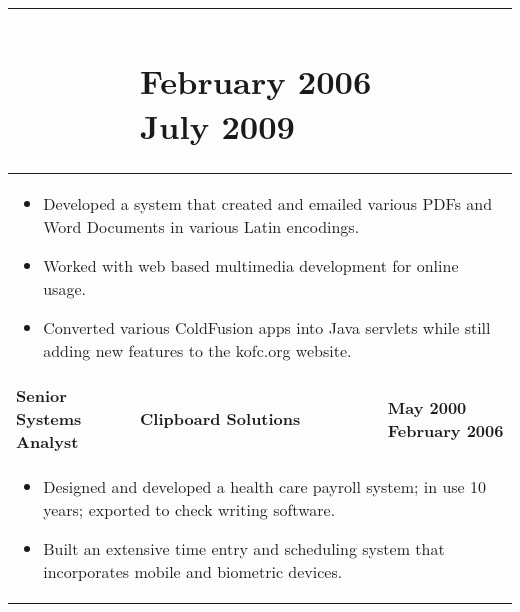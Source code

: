 \documentclass{scrbook}
\begin{document}
\begin{table}
\begin{tabularx}{\textwidth}{|
p{}|
p{}|
p{}|}
 & \section{February 2006 \textendash{} July 2009}
\\\hline 
\multicolumn{3}{|p{\dimexpr 1.001\linewidth-2\tabcolsep-2\arrayrulewidth}|}{
\begin{itemize}
\item Developed a system that created and emailed various PDFs and Word Documents in various Latin encodings. 
\item Worked with web based multimedia development for online usage.
\item Converted various ColdFusion apps into Java servlets while still adding new features to the kofc.org website.
\end{itemize}
} &\\\hline 
\textbf{Senior Systems Analyst} & \centering\arraybackslash{}\textbf{Clipboard Solutions} & \raggedleft\arraybackslash{}\textbf{May 2000 \textendash{} February 2006}\\\hline 
\multicolumn{3}{|p{\dimexpr 1.001\linewidth-2\tabcolsep-2\arrayrulewidth}|}{
\begin{itemize}
\item Designed and developed a health care payroll system; in use 10 years; exported to check writing software.
\item Built an extensive time entry and scheduling system that incorporates mobile and biometric devices.
\end{itemize}
} &\\\hline 
\end{tabularx}
\end{table}
\end{document}

